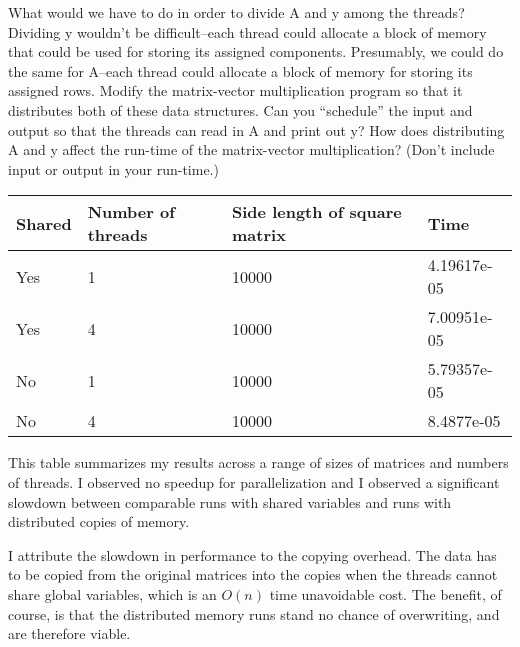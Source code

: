 \documentclass[11pt,epsfig,letterpaper]{article}
\begin{document}
\begin{enumerate}
            What would we have to do in order to divide A and y among the threads? Dividing y wouldn’t be difficult–each thread could allocate a block of memory that could be used for storing its assigned components. Presumably, we could do the same for A–each thread could allocate a block of memory for storing its assigned rows. Modify the matrix-vector multiplication program so that it distributes both of these data structures. Can you “schedule” the input and output so that the threads can read in A and print out y?
            How does distributing A and y affect the run-time of the matrix-vector multiplication? (Don’t include input or output in your run-time.)
            \vspace{0.5pc}

            \begin{center}
            \begin{tabular}{ | l | l | l | p{5cm} |}
            \hline
            Shared & Number of threads & Side length of square matrix & Time \\ \hline
            Yes & 1 & 10000 & 4.19617e-05
             \\ \hline
            Yes & 4 & 10000 & 7.00951e-05
             \\ \hline
            No & 1 & 10000 &  5.79357e-05
            \\ \hline
            No & 4 & 10000 &  8.4877e-05 \\
            \hline
            \end{tabular}
            \end{center}

            \quad This table summarizes my results across a range of sizes of matrices and numbers of threads. I observed no speedup for parallelization and I observed a significant slowdown between comparable runs with shared variables and runs with distributed copies of memory.

            \quad I attribute the slowdown in performance to the copying overhead. The data has to be copied from the original matrices into the copies when the threads cannot share global variables, which is an $O(n)$ time unavoidable cost. The benefit, of course, is that the distributed memory runs stand no chance of overwriting, and are therefore viable.


\end{enumerate}
\end{document}
